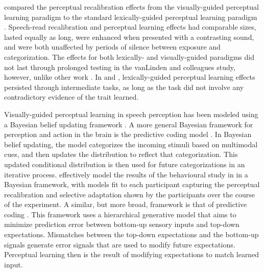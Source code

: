 \citet{vanLinden2007} compared the perceptual recalibration effects from the visually-guided perceptual learning paradigm \citep{Bertelson2003} to the standard lexically-guided perceptual learning paradigm \citep{Norris2003}.  
Speech-read recalibration and perceptual learning effects had comparable sizes, lasted equally as long, were enhanced when presented with a contrasting sound, and were both unaffected by periods of silence between exposure and categorization.  
The effects for both lexically- and visually-guided paradigms did not last through prolonged testing in the vanLinden and colleagues study, however, unlike other work \citep{Kraljic2005,Eisner2006}.
In \citet{Kraljic2005} and \citet{Eisner2006}, lexically-guided perceptual learning effects persisted through intermediate tasks, as long as the task did not involve any contradictory evidence of the trait learned.

Visually-guided perceptual learning in speech perception has been modeled using a Bayesian belief updating framework \citep{Kleinschmidt2011}.  
A more general Bayesian framework for perception and action in the brain is the predictive coding model \citep{Clark2013}.
In Bayesian belief updating, the model categorizes the incoming stimuli based on multimodal cues, and then updates the distribution to reflect that categorization.  
This updated conditional distribution is then used for future categorizations in an iterative process.  
\citet{Kleinschmidt2011} effectively model the results of the behavioural study in \citet{Vroomen2007} in a Bayesian framework, with models fit to each participant capturing the perceptual recalibration and selective adaptation shown by the participants over the course of the experiment.  
A similar, but more broad, framework is that of predictive coding \citep{Clark2013}. 
This framework uses a hierarchical generative model that aims to minimize prediction error between bottom-up sensory inputs and top-down expectations.  
Mismatches between the top-down expectations and the bottom-up signals generate error signals that are used to modify future expectations.  
Perceptual learning then is the result of modifying expectations to match learned input.

